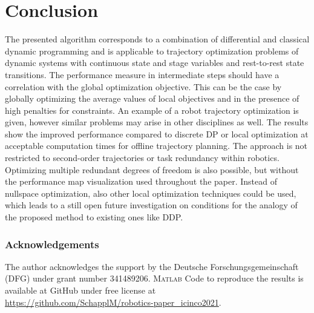 \documentclass[runningheads]{llncs}
\begin{document}
\section{Conclusion}
\label{sec:conclusion}

The presented algorithm corresponds to a combination of differential and classical dynamic programming and is applicable to trajectory optimization problems of dynamic systems with continuous state and stage variables and rest-to-rest state transitions.
The performance measure in intermediate steps should have a correlation with the global optimization objective.
This can be the case by globally optimizing the average values of local objectives and in the presence of high penalties for constraints.
An example of a robot trajectory optimization is given, however similar problems may arise in other disciplines as well.
The results show the improved performance compared to discrete DP or local optimization at acceptable computation times for offline trajectory planning.
The approach is not restricted to second-order trajectories or task redundancy within robotics.
Optimizing multiple redundant degrees of freedom is also possible, but without the performance map visualization used throughout the paper.
Instead of nullspace optimization, also other local optimization techniques could be used, which leads to a still open future investigation on conditions for the analogy of the proposed method to existing ones like DDP.

\subsubsection{Acknowledgements} The author acknowledges the support by the Deutsche Forschungsgemeinschaft (DFG) under grant number 341489206.
\textsc{Matlab} Code to reproduce the results is available at GitHub under free license at\\ \url{https://github.com/SchapplM/robotics-paper_icinco2021}.

%
%



\end{document}
